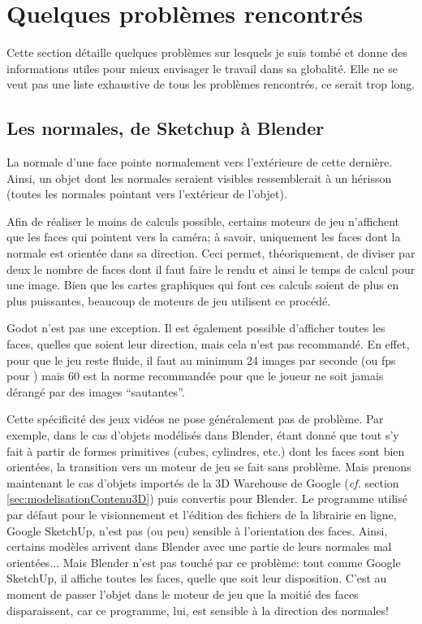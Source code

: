 \section{Quelques problèmes rencontrés}

\begin{note}
	Cette section détaille quelques problèmes sur lesquels je suis tombé et donne des informations utiles pour mieux envisager le travail dans sa globalité. Elle ne se veut pas une liste exhaustive de tous les problèmes rencontrés, ce serait trop long.
\end{note}

\subsection{Les normales, de Sketchup à Blender}
La normale d'une face pointe normalement vers l'extérieure de cette dernière. Ainsi, un objet dont les normales seraient visibles ressemblerait à un hérisson (toutes les normales pointant vers l'extérieur de l'objet).

Afin de réaliser le moins de calculs possible, certains moteurs de jeu n'affichent que les faces qui pointent vers la caméra; à savoir, uniquement les faces dont la normale est orientée dans sa direction. Ceci permet, théoriquement, de diviser par deux le nombre de faces dont il faut faire le rendu et ainsi le temps de calcul pour une image. Bien que les cartes graphiques qui font ces calculs soient de plus en plus puissantes, beaucoup de moteurs de jeu utilisent ce procédé.

Godot n'est pas une exception. Il est également possible d'afficher toutes les faces, quelles que soient leur direction, mais cela n'est pas recommandé. En effet, pour que le jeu reste fluide, il faut au minimum 24 images par seconde (ou fps pour ) mais 60 est la norme recommandée pour que le joueur ne soit jamais dérangé par des images \enquote{sautantes}.

Cette spécificité des jeux vidéos ne pose généralement pas de problème. Par exemple, dans le cas d'objets modélisés dans Blender, étant donné que tout s'y fait à partir de formes primitives (cubes, cylindres, etc.) dont les faces sont bien orientées, la transition vers un moteur de jeu se fait sans problème. Mais prenons maintenant le cas d'objets importés de la 3D Warehouse de Google (\textit{cf.} section \ref{sec:modelisationContenu3D}) puis convertis pour Blender. Le programme utilisé par défaut pour le visionnement et l'édition des fichiers de la librairie en ligne, Google SketchUp, n'est pas (ou peu) sensible à l'orientation des faces. Ainsi, certains modèles arrivent dans Blender avec une partie de leurs normales mal orientées... Mais Blender n'est pas touché par ce problème: tout comme Google SketchUp, il affiche toutes les faces, quelle que soit leur disposition. C'est au moment de passer l'objet dans le moteur de jeu que la moitié des faces disparaissent, car ce programme, lui,  est sensible à la direction des normales!

